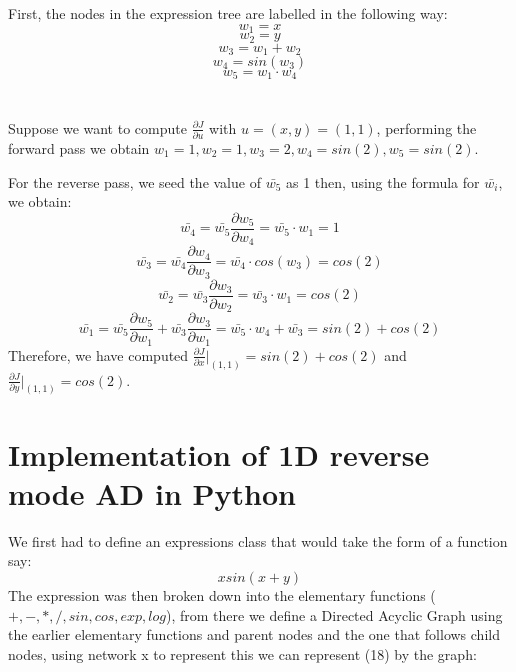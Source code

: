 \documentclass{article}
\begin{document}
First, the nodes in the expression tree are labelled in the following way:
\begin{equation}
w_1 = x
\end{equation}
\begin{equation}
w_2 = y
\end{equation}
\begin{equation}
w_3 = w_1 + w_2
\end{equation}
\begin{equation}
w_4 = sin(w_3)
\end{equation}
\begin{equation}
w_5 = w_1 \cdot w_4
\end{equation}
\\\\

Suppose we want to compute $\frac{\partial{J}}{\partial{u}}$ with $u = (x, y) = (1, 1)$, performing the forward pass we obtain $w_1 = 1, w_2 = 1, w_3 = 2, w_4 = sin(2), w_5 = sin(2)$.

For the reverse pass, we seed the value of $\bar{w_5}$ as 1 then, using the formula for $\bar{w_i}$, we obtain:
\begin{equation}
\bar{w_4} = \bar{w_5}\frac{\partial{w_5}}{\partial{w_4}} = \bar{w_5}\cdot w_1 = 1
\end{equation}
\begin{equation}
\bar{w_3} = \bar{w_4}\frac{\partial{w_4}}{\partial{w_3}} = \bar{w_4}\cdot cos(w_3) = cos(2)
\end{equation}
\begin{equation}
\bar{w_2} = \bar{w_3}\frac{\partial{w_3}}{\partial{w_2}} = \bar{w_3}\cdot w_1 = cos(2)
\end{equation}
\begin{equation}
\bar{w_1} = \bar{w_5}\frac{\partial{w_5}}{\partial{w_1}} + \bar{w_3}\frac{\partial{w_3}}{\partial{w_1}} = \bar{w_5}\cdot w_4 + \bar{w_3} = sin(2) + cos(2)
\end{equation}
Therefore, we have computed $\frac{\partial{J}}{\partial{x}}\vert_{(1, 1)} = sin(2) + cos(2)$ and $\frac{\partial{J}}{\partial{y}}\vert_{(1, 1)} = cos(2)$.

\section{Implementation of 1D reverse mode AD in Python}

We first had to define an expressions class that would take the form of a function say:
\begin{equation}
xsin(x+y)
\end{equation}
The expression was then broken down into the elementary functions ($+, -, *, /, sin, cos, exp, log$), from there we define a Directed Acyclic Graph using the earlier elementary functions and parent nodes and the one that follows child nodes, using network x to represent this we can represent (18) by the graph:
\end{document}
